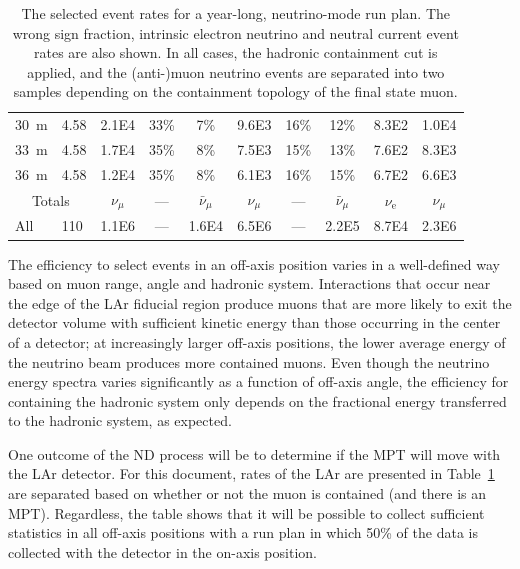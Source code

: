 \begin{table}
\begin{tabular}{ l l || c c | c || c c | c | c || c }
 30~m  &  4.58  & 2.1E4 & 33\% & 7\% & 9.6E3 & 16\% & 12\% & 8.3E2 & 1.0E4 \\
 33~m  &  4.58  & 1.7E4 & 35\% & 8\% & 7.5E3 & 15\% & 13\% & 7.6E2 & 8.3E3 \\
 36~m  &  4.58  & 1.2E4 & 35\% & 8\% & 6.1E3 & 16\% & 15\% & 6.7E2 & 6.6E3 \\
\hline
\hline
\multicolumn{2}{c||}{Totals} & $\nu_{\mu}$ & --- & $\bar{\nu}_{\mu}$ & $\nu_{\mu}$ & --- & $\bar{\nu}_{\mu}$ & $\nu_\textrm{e}$ & $\nu_{\mu}$ \\ \hline
 All  &  110  & 1.1E6 & --- & 1.6E4 & 6.5E6 & --- & 2.2E5 & 8.7E4 & 2.3E6 \\
\end{tabular}

\caption{The selected event rates for a year-long, neutrino-mode run plan. The wrong sign fraction, intrinsic electron neutrino and neutral current event rates are also shown. In all cases, the hadronic containment cut is applied, and the (anti-)muon neutrino events are separated into two samples depending on the containment topology of the final state muon.}
\label{table:evrates_LAR}
\end{table}

The efficiency to select events in an off-axis position varies in a well-defined way based on muon range, angle and hadronic system. Interactions that occur near the edge of the LAr fiducial region produce muons that are more likely to exit the detector volume with sufficient kinetic energy than those occurring in the center of a detector; at increasingly larger off-axis positions, the lower average energy of the neutrino beam produces more contained muons. Even though the neutrino energy spectra varies significantly as a function of off-axis angle, the efficiency for containing the hadronic system only depends on the fractional energy transferred to the hadronic system, as expected. 


One outcome of the ND process will be to determine if the MPT will move with the LAr detector. For this document, rates of the LAr are presented in Table~\ref{table:evrates_LAR} are separated based on whether or not the muon is contained (and there is an MPT). Regardless, the table shows that it will be possible to collect sufficient statistics in all off-axis positions with a run plan in which 50\% of the data is collected with the detector in the on-axis position. 

